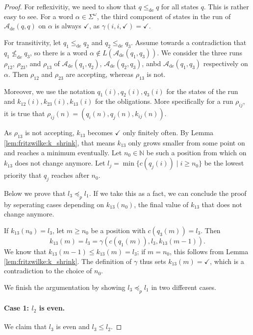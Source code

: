 \begin{proof}
	For reflexivitiy, we need to show that $q \leq_\text{de} q$ for all states $q$. This is rather easy to see. For a word $\alpha \in \Sigma^\omega$, the third component of states in the run of $\mathcal{A}_\text{de}(q, q)$ on $\alpha$ is always $\checkmark$, as $\gamma(i, i, \checkmark) = \checkmark$.
	
	For transitivity, let $q_1 \leq_\text{de} q_2$ and $q_2 \leq_\text{de} q_3$. Assume towards a contradiction that $q_1 \not\leq_\text{de} q_3$, so there is a word $\alpha \notin L(\mathcal{A}_\text{de}(q_1, q_3))$. We consider the three runs $\rho_{12}$, $\rho_{23}$, and $\rho_{13}$ of $\mathcal{A}_\text{de}(q_1, q_2)$, $\mathcal{A}_\text{de}(q_2, q_3)$, anbd $\mathcal{A}_\text{de}(q_1, q_3)$ respectively on $\alpha$. Then $\rho_{12}$ and $\rho_{23}$ are accepting, whereas $\rho_{13}$ is not. 
	
	Moreover, we use the notation $q_1(i), q_2(i), q_3(i)$ for the states of the run and $k_{12}(i), k_{23}(i), k_{13}(i)$ for the obligations. More specifically for a run $\rho_{ij}$, it is true that $\rho_{ij}(n) = (q_i(n), q_j(n), k_{ij}(n))$.
	
	As $\rho_{13}$ is not accepting, $k_{13}$ becomes $\checkmark$ only finitely often. By Lemma \ref{lem:fritzwilke:k_shrink}, that means $k_{13}$ only grows smaller from some point on and reaches a minimum eventually. Let $n_0 \in \mathbb{N}$ be such a position from which on $k_{13}$ does not change anymore. Let $l_j = \min \{ c(q_j(i)) \mid i \geq n_0 \}$ be the lowest priority that $q_j$ reaches after $n_0$.
	
	Below we prove that $l_3 \preceq_p l_1$. If we take this as a fact, we can conclude the proof by seperating cases depending on $k_{13}(n_0)$, the final value of $k_{13}$ that does not change anymore.
	
	If $k_{13}(n_0) = l_3$, let $m \geq n_0$ be a position with $c(q_3(m)) = l_3$. Then $$k_{13}(m) = l_3 = \gamma(c(q_1(m)), l_3, k_{13}(m-1)).$$
	We know that $k_{13}(m-1) \leq k_{13}(m) = l_3$; if $m = n_0$, this follows from Lemma \ref{lem:fritzwilke:k_shrink}. The definition of $\gamma$ thus sets $k_{13}(m) = \checkmark$, which is a contradiction to the choice of $n_0$.
	
	We finish the argumentation by showing $l_3 \preceq_p l_1$ in two different cases.
	
	\paragraph{Case 1: $l_2$ is even.} We claim that $l_3$ is even and $l_3 \leq l_2$. 
	

\end{proof}
